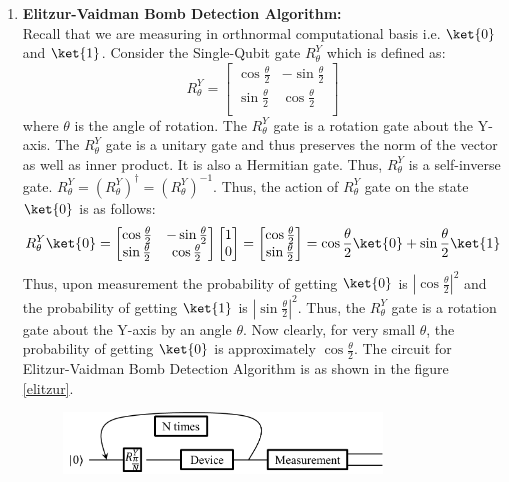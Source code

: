 \documentclass[12pt, oneside]{book}
\theoremstyle{definition}
\theoremstyle{definition}
\theoremstyle{remark}
\begin{document}
\begin{enumerate}
    \item \textbf{Elitzur-Vaidman Bomb Detection Algorithm: }\\
    Recall that we are measuring in orthnormal computational basis i.e. $\ket{0}$ and $\ket{1}$. Consider the Single-Qubit gate $R^Y_{\theta}$ which is defined as:
    \[
        R^Y_{\theta}=\begin{bmatrix}
            \cos\frac{\theta}{2} & -\sin\frac{\theta}{2} \\
            \sin\frac{\theta}{2} & \cos\frac{\theta}{2} \\
        \end{bmatrix}
    \]
    where $\theta$ is the angle of rotation. The $R^Y_{\theta}$ gate is a rotation gate about the Y-axis. The $R^Y_{\theta}$ gate is a unitary gate and thus preserves the norm of the vector as well as inner product. It is also a Hermitian gate. Thus, $R^Y_{\theta}$ is a self-inverse gate. $R^Y_{\theta}=(R^Y_{\theta})^{\dagger}=(R^Y_{\theta})^{-1}$.
    Thus, the action of $R^Y_{\theta}$ gate on the state $\ket{0}$ is as follows:
    \[
        R^Y_{\theta}\ket{0}=\begin{bmatrix}
            \cos\frac{\theta}{2} & -\sin\frac{\theta}{2} \\
            \sin\frac{\theta}{2} & \cos\frac{\theta}{2} \\
        \end{bmatrix}\begin{bmatrix}
            1 \\
            0 \\
        \end{bmatrix}=\begin{bmatrix}
            \cos\frac{\theta}{2} \\
            \sin\frac{\theta}{2} \\
        \end{bmatrix}=\cos\frac{\theta}{2}\ket{0}+\sin\frac{\theta}{2}\ket{1}
    \]
    Thus, upon measurement the probability of getting $\ket{0}$ is $|\cos\frac{\theta}{2}|^2$ and the probability of getting $\ket{1}$ is $|\sin\frac{\theta}{2}|^2$. Thus, the $R^Y_{\theta}$ gate is a rotation gate about the Y-axis by an angle $\theta$.
    Now clearly, for very small $\theta$, the probability of getting $\ket{0}$ is approximately $\cos \frac{\theta}{2}$.
    The circuit for Elitzur-Vaidman Bomb Detection Algorithm is as shown in the figure \ref{elitzur}.
    \begin{figure}[H]
        \centering
        \includegraphics[width=0.8\textwidth]{../images/elitzur-vaidmanfinal.png}

\end{figure}
\end{enumerate}
\end{document}
